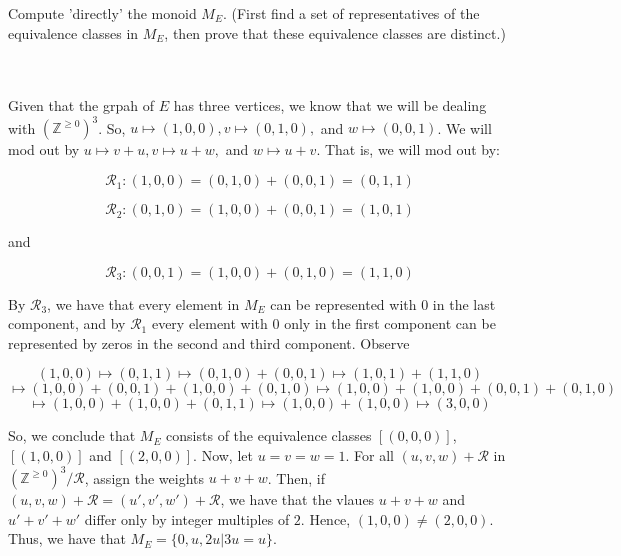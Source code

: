 Compute 'directly' the monoid $M_E$. (First find a set of representatives of the equivalence classes in
$M_E$, then prove that these equivalence classes are distinct.)\\\\

\begin{solution}\renewcommand{\qedsymbol}{}\ \\
    Given that the grpah of $E$ has three vertices, we know that we will be dealing with
    $(\mathbb{Z}^{\geq0})^3$. So, $u\mapsto(1,0,0), v\mapsto(0,1,0),$ and $w\mapsto(0,0,1)$. We will mod
    out by $u\mapsto v+u, v\mapsto u+w,$ and $w\mapsto u+v$. That is, we will mod out by:

    $$\mathcal{R}_1:(1,0,0)=(0,1,0)+(0,0,1)=(0,1,1)$$

    $$\mathcal{R}_2:(0,1,0)=(1,0,0)+(0,0,1)=(1,0,1)$$

    and

    $$\mathcal{R}_3:(0,0,1)=(1,0,0)+(0,1,0)=(1,1,0)$$

    By $\mathcal{R}_3$, we have that every element in $M_E$ can be represented with $0$ in the last
    component, and by $\mathcal{R}_1$ every element with $0$ only in the first component can be
    represented by zeros in the second and third component. Observe

    $$(1,0,0)\mapsto(0,1,1)\mapsto(0,1,0)+(0,0,1)\mapsto(1,0,1)+(1,1,0)$$
    $$\mapsto(1,0,0)+(0,0,1)+(1,0,0)+(0,1,0)\mapsto(1,0,0)+(1,0,0)+(0,0,1)+(0,1,0)$$
    $$\mapsto(1,0,0)+(1,0,0)+(0,1,1)\mapsto(1,0,0)+(1,0,0)\mapsto(3,0,0)$$

    So, we conclude that $M_E$ consists of the equivalence classes $[(0,0,0)]$, $[(1,0,0)]$ and
    $[(2,0,0)]$. Now, let $u=v=w=1$. For all $(u,v,w)+\mathcal{R}$ in
    $(\mathbb{Z}^{\geq0})^3/\mathcal{R}$, assign the weights $u+v+w$. Then, if
    $(u,v,w)+\mathcal{R}=(u',v',w')+\mathcal{R}$, we have that the vlaues $u+v+w$ and $u'+v'+w'$ differ
    only by integer multiples of $2$. Hence, $(1,0,0)\neq(2,0,0)$. Thus, we have that
    $M_E=\{0,u,2u|3u=u\}$.

\end{solution}